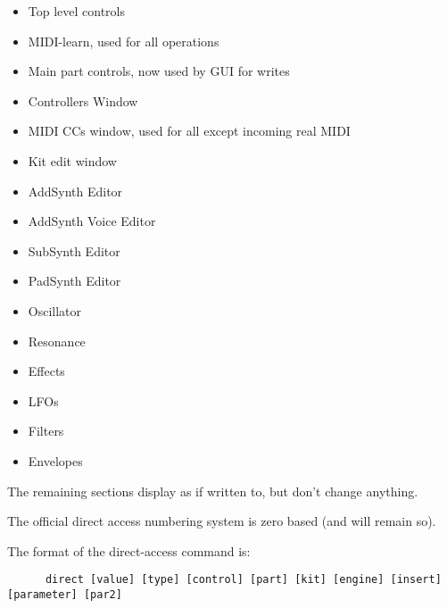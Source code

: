    \begin{itemize}
      \item Top level controls
      \item MIDI-learn, used for all operations
      \item Main part controls, now used by GUI for writes
      \item Controllers Window
      \item MIDI CCs window, used for all except incoming real MIDI
      \item Kit edit window
      \item AddSynth Editor
      \item AddSynth Voice Editor
      \item SubSynth Editor
      \item PadSynth Editor
      \item Oscillator
      \item Resonance
      \item Effects
      \item LFOs
      \item Filters
      \item Envelopes
   \end{itemize}

   The remaining sections display as if written to, but don't change anything.

   The official direct access numbering system is zero based (and will remain
   so).

%
%

   The format of the direct-access command is:

   \begin{verbatim}
      direct [value] [type] [control] [part] [kit] [engine] [insert] [parameter] [par2]
   \end{verbatim}

